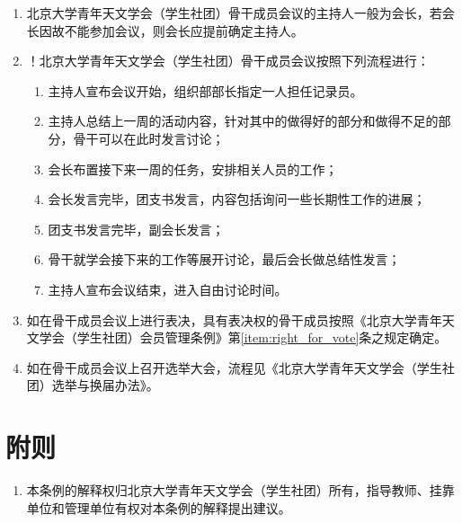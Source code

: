 \begin{enumerate}[resume]
    \item 北京大学青年天文学会（学生社团）骨干成员会议的主持人一般为会长，若会长因故不能参加会议，则会长应提前确定主持人。
    
    \item ！北京大学青年天文学会（学生社团）骨干成员会议按照下列流程进行：
    \begin{enumerate}
        \item 主持人宣布会议开始，组织部部长指定一人担任记录员。
        \item 主持人总结上一周的活动内容，针对其中的做得好的部分和做得不足的部分，骨干可以在此时发言讨论；
        \item 会长布置接下来一周的任务，安排相关人员的工作；
        \item 会长发言完毕，团支书发言，内容包括询问一些长期性工作的进展；
        \item 团支书发言完毕，副会长发言；
        \item 骨干就学会接下来的工作等展开讨论，最后会长做总结性发言；
        \item 主持人宣布会议结束，进入自由讨论时间。
    \end{enumerate}

    \item 如在骨干成员会议上进行表决，具有表决权的骨干成员按照《北京大学青年天文学会（学生社团）会员管理条例》第\ref{item:right_for_vote}条之规定确定。

    \item 如在骨干成员会议上召开选举大会，流程见《北京大学青年天文学会（学生社团）选举与换届办法》。
\end{enumerate}

\section{附则}

\begin{enumerate}[resume]
    \item 本条例的解释权归北京大学青年天文学会（学生社团）所有，指导教师、挂靠单位和管理单位有权对本条例的解释提出建议。
\end{enumerate}
